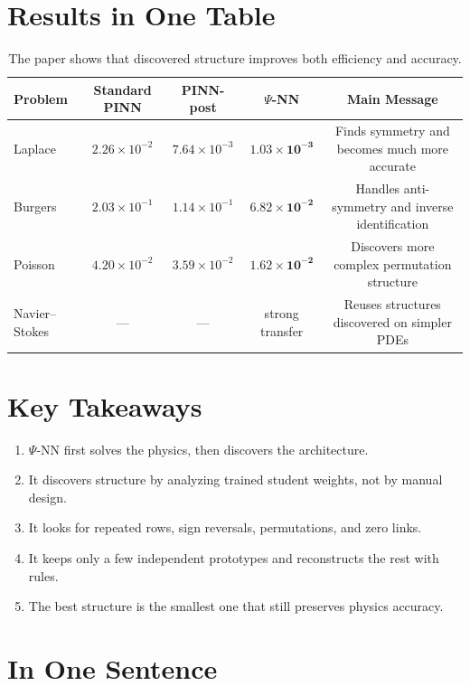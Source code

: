 \documentclass[11pt,a4paper]{article}
\begin{document}
\section{Results in One Table}

\begin{table}[H]
\centering
\small
\begin{tabularx}{\textwidth}{@{}lCCCC@{}}
\toprule
\textbf{Problem} & \textbf{Standard PINN} & \textbf{PINN-post} & \textbf{$\Psi$-NN} & \textbf{Main Message} \\
\midrule
Laplace & $2.26\times 10^{-2}$ & $7.64\times 10^{-3}$ & $\mathbf{1.03\times 10^{-3}}$ & Finds symmetry and becomes much more accurate \\
Burgers & $2.03\times 10^{-1}$ & $1.14\times 10^{-1}$ & $\mathbf{6.82\times 10^{-2}}$ & Handles anti-symmetry and inverse identification \\
Poisson & $4.20\times 10^{-2}$ & $3.59\times 10^{-2}$ & $\mathbf{1.62\times 10^{-2}}$ & Discovers more complex permutation structure \\
Navier--Stokes & --- & --- & strong transfer & Reuses structures discovered on simpler PDEs \\
\bottomrule
\end{tabularx}
\caption{The paper shows that discovered structure improves both efficiency and accuracy.}
\end{table}

\section{Key Takeaways}

\begin{enumerate}[leftmargin=*]
    \item $\Psi$-NN first solves the physics, then discovers the architecture.
    \item It discovers structure by analyzing trained student weights, not by manual design.
    \item It looks for repeated rows, sign reversals, permutations, and zero links.
    \item It keeps only a few independent prototypes and reconstructs the rest with rules.
    \item The best structure is the smallest one that still preserves physics accuracy.
\end{enumerate}

\section{In One Sentence}

\begin{center}
\end{center}
\end{document}
